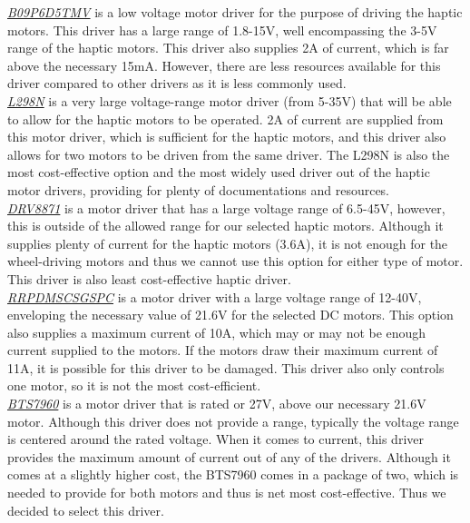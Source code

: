 \noindent \underline{\textit{B09P6D5TMV}} is a low voltage motor driver for the purpose of driving the haptic motors. This driver has a large range of 1.8-15V, well encompassing the 3-5V range of the haptic motors. This driver also supplies 2A of current, which is far above the necessary 15mA. However, there are less resources available for this driver compared to other drivers as it is less commonly used.\\

\noindent \underline{\textit{L298N}} is a very large voltage-range motor driver (from 5-35V) that will be able to allow for the haptic motors to be operated. 2A of current are supplied from this motor driver, which is sufficient for the haptic motors, and this driver also allows for two motors to be driven from the same driver. The L298N is also the most cost-effective option and the most widely used driver out of the haptic motor drivers, providing for plenty of documentations and resources.\\

\noindent \underline{\textit{DRV8871}} is a motor driver that has a large voltage range of 6.5-45V, however, this is outside of the allowed range for our selected haptic motors. Although it supplies plenty of current for the haptic motors (3.6A), it is not enough for the wheel-driving motors and thus we cannot use this option for either type of motor. This driver is also least cost-effective haptic driver.\\
 
\noindent \underline{\textit{RRPDMSCSGSPC}} is a motor driver with a large voltage range of 12-40V, enveloping the necessary value of 21.6V for the selected DC motors. This option also supplies a maximum current of 10A, which may or may not be enough current supplied to the motors. If the motors draw their maximum current of 11A, it is possible for this driver to be damaged. This driver also only controls one motor, so it is not the most cost-efficient.\\
 
\noindent \underline{\textit{BTS7960}} is a motor driver that is rated or 27V, above our necessary 21.6V motor. Although this driver does not provide a range, typically the voltage range is centered around the rated voltage. When it comes to current, this driver provides the maximum amount of current out of any of the drivers. Although it comes at a slightly higher cost, the BTS7960 comes in a package of two, which is needed to provide for both motors and thus is net most cost-effective. Thus we decided to select this driver.\\
 
